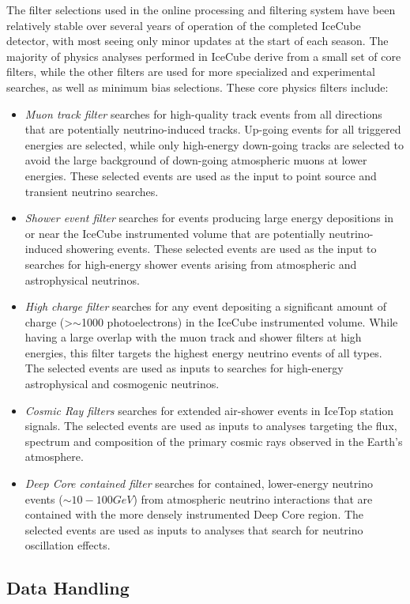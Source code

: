The filter selections used in the online processing and filtering system have been relatively stable
over several years of operation of the completed IceCube detector, with most seeing only minor updates at the start of
each season.  The majority of physics analyses performed in IceCube derive from a small set of core filters, while the other
filters are used for more specialized and experimental searches, as well as minimum bias selections.  These core physics filters include:
\begin{itemize}
\item \emph {Muon track filter} searches for high-quality track events from all directions that are potentially
neutrino-induced tracks.  Up-going events for all triggered energies are selected, while only high-energy down-going tracks are
selected to avoid the large background of down-going atmospheric muons at lower energies.  These selected events are used
as the input to point source and transient neutrino searches.
\item \emph {Shower event filter} searches for events producing large energy depositions in or near the IceCube instrumented volume that
are potentially neutrino-induced showering events.  These selected events are used as the input to searches for 
high-energy shower events arising from atmospheric and astrophysical neutrinos.  
\item \emph {High charge filter} searches for any event depositing a significant amount of charge (\textgreater $\sim$1000 photoelectrons) 
in the IceCube instrumented volume.  While having a large overlap with the muon track and shower filters at high energies,
this filter targets the highest energy neutrino events of all types. The selected events are used as inputs to searches
for high-energy astrophysical and cosmogenic neutrinos.
\item \emph {Cosmic Ray filters} searches for extended air-shower events in IceTop station signals.  The selected events
are used as inputs to analyses targeting the flux, spectrum and composition of the primary cosmic rays observed in the
Earth's atmosphere.
\item \emph {Deep Core contained filter} searches for contained, lower-energy neutrino events ($\sim10-100 GeV$)
from atmospheric neutrino interactions that are contained with the more densely instrumented Deep Core region.  The selected
events are used as inputs to analyses that search for neutrino oscillation effects.
\end{itemize}
\subsection{Data Handling}

